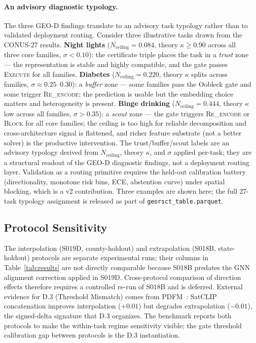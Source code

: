 \documentclass{article}
\begin{document}
\paragraph{An advisory diagnostic typology.}
The three GEO-D findings translate to an advisory task typology rather than to validated deployment routing. Consider three illustrative tasks drawn from the CONUS-27 results. \textbf{Night lights} ($N_{\text{ceiling}} = 0.084$, theory $\kappa \geq 0.90$ across all three core families, $\sigma < 0.10$): the certificate triple places the task in a \emph{trust} zone --- the representation is stable and highly compatible, and the gate passes \textsc{Execute} for all families. \textbf{Diabetes} ($N_{\text{ceiling}} = 0.220$, theory $\kappa$ splits across families, $\sigma \approx 0.25$--$0.30$): a \emph{buffer} zone --- some families pass the Oobleck gate and some trigger \textsc{Re\_encode}; the prediction is usable but the embedding choice matters and heterogeneity is present. \textbf{Binge drinking} ($N_{\text{ceiling}} = 0.444$, theory $\kappa$ low across all families, $\sigma > 0.35$): a \emph{scout} zone --- the gate triggers \textsc{Re\_encode} or \textsc{Block} for all core families; the ceiling is too high for reliable decomposition and cross-architecture signal is flattened, and richer feature substrate (not a better solver) is the productive intervention. The trust/buffer/scout labels are an advisory typology derived from $N_{\text{ceiling}}$, theory $\kappa$, and $\sigma$ applied per-task; they are a structural readout of the GEO-D diagnostic findings, not a deployment routing layer. Validation as a routing primitive requires the held-out calibration battery (directionality, monotone risk bins, ECE, abstention curve) under spatial blocking, which is a v2 contribution. Three examples are shown here; the full 27-task typology assignment is released as part of \texttt{georsct\_table.parquet}.

\subsection{Protocol Sensitivity}

The interpolation (S019D, county-holdout) and extrapolation (S018B, state-holdout) protocols are separate experimental runs; their columns in Table~\ref{tab:results} are not directly comparable because S018B predates the GNN alignment correction applied in S019D. Cross-protocol comparison of direction effects therefore requires a controlled re-run of S018B and is deferred. External evidence for D.3 (Threshold Mismatch) comes from PDFM~\citep{agarwal2025pdfm}: SatCLIP concatenation improves interpolation ($+0.01$) but degrades extrapolation ($-0.01$), the signed-delta signature that D.3 organizes. The benchmark reports both protocols to make the within-task regime sensitivity visible; the gate threshold calibration gap between protocols is the D.3 instantiation.
\end{document}
